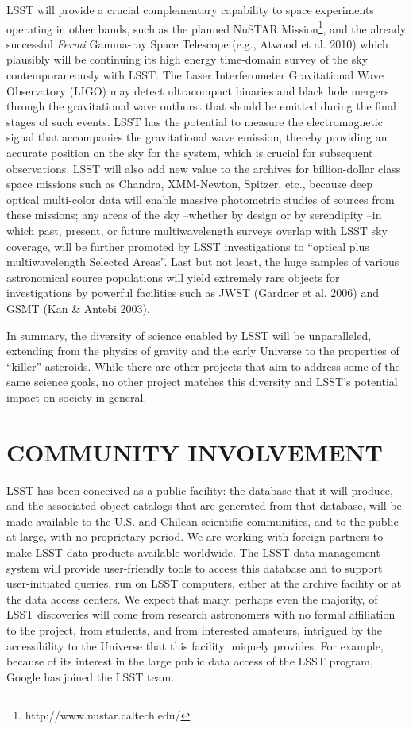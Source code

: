 \documentclass{emulateapj}
\newcommand{\B}[1]{{#1}}
\begin{document}
LSST will provide a crucial complementary capability to space 
experiments operating in other bands, such as the planned 
NuSTAR Mission\footnote{http://www.nustar.caltech.edu/}, and the already successful {\it Fermi} 
Gamma-ray Space Telescope (e.g., Atwood et al. 2010) which plausibly will be continuing its high 
energy time-domain survey of the sky contemporaneously with LSST. 
The Laser Interferometer Gravitational 
Wave Observatory (LIGO) may detect ultracompact binaries and black hole mergers through the 
gravitational wave outburst that should be emitted during the final stages of such events. 
LSST has the potential to measure the electromagnetic signal that accompanies the gravitational wave emission, 
thereby providing an accurate position on the sky for the system, which is 
crucial for subsequent observations. LSST will also add new value to the archives for 
billion-dollar class space missions such as Chandra, XMM-Newton, Spitzer,
etc., because deep optical multi-color data will enable 
massive photometric  studies of sources from these missions;
any areas of the sky --whether by design or by serendipity --in which past, present, or future 
multiwavelength surveys overlap with LSST sky coverage, will be further promoted by LSST 
investigations to ``optical plus multiwavelength Selected Areas''.   
Last but not least, the huge samples of various astronomical source
populations will yield extremely rare objects for investigations by powerful
facilities such as JWST (Gardner et al. 2006) and GSMT (Kan \& Antebi 2003).

In summary, the diversity of science enabled by LSST will be 
unparalleled, extending from the physics of gravity and the
early Universe to the properties of ``killer'' asteroids. While
there are other projects that aim to address some of the same
science goals, no other project matches this diversity and 
LSST's potential impact on society in general. 


\section{   COMMUNITY INVOLVEMENT   }
\label{Sec:community}

LSST has been conceived as a public facility: the database that it will
produce, and the associated object catalogs that are generated from that
database, will be made available to the \B{U.S. and Chilean} scientific communities,
and to the public at large, with no proprietary period. We are working with foreign partners 
to make LSST data products available worldwide. The LSST data management 
system will provide user-friendly tools to access this database and to support
user-initiated queries, run on LSST computers, either at the archive facility 
or at the data access centers. We expect that many, perhaps even the majority,
of LSST discoveries will come from research astronomers with no formal
affiliation to the project, from students, and from interested amateurs, 
intrigued by the accessibility to the Universe that this facility uniquely 
provides. For example, because of its interest in the large public data access 
of the LSST program, Google has joined the LSST team. 
\end{document}

